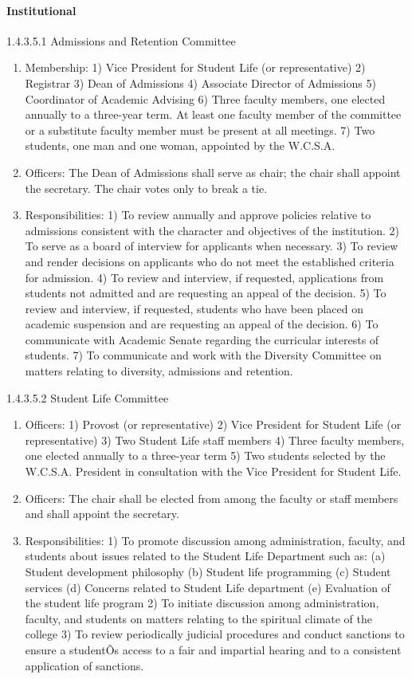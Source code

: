 \documentclass[letterpaper, 11pt]{article}
\begin{document}
			\paragraph{Institutional}
				1.4.3.5.1 Admissions and Retention Committee
				\begin{enumerate}[label=\alph*)]
					\item{Membership:}
					1) Vice President for Student Life (or representative)
					2) Registrar
					3) Dean of Admissions
					4) Associate Director of Admissions
					5) Coordinator of Academic Advising
					6) Three faculty members, one elected annually to a three-year term.  At least one faculty member of the committee or a substitute faculty member must be present at all meetings.
					7) Two students, one man and one woman, appointed by the W.C.S.A.
					\item{Officers:}
					The Dean of Admissions shall serve as chair; the chair shall appoint the secretary.  The chair votes only to break a tie.
					\item{Responsibilities:}
					1) To review annually and approve policies relative to admissions consistent with the character and objectives of the institution.
					2) To serve as a board of interview for applicants when necessary.
					3) To review and render decisions on applicants who do not meet the established criteria for admission.
					4) To review and interview, if requested, applications from students not admitted and are requesting an appeal of the decision.
					5) To review and interview, if requested, students who have been placed on academic suspension and are requesting an appeal of the decision.
					6) To communicate with Academic Senate regarding the curricular interests of students.
					7) To communicate and work with the Diversity Committee on matters relating to diversity, admissions and retention.
				\end{enumerate}
				1.4.3.5.2 Student Life Committee
				\begin{enumerate}[label=\alph*)]
					\item{Officers:}
					1) Provost (or representative)
					2) Vice President for Student Life (or representative)
					3) Two Student Life staff members
					4) Three faculty members, one elected annually to a three-year term
					5) Two students selected by the W.C.S.A. President in consultation with the Vice President for Student Life.
					\item{Officers:}
					The chair shall be elected from among the faculty or staff members and shall appoint the secretary.
					\item{Responsibilities:}
					1) To promote discussion among administration, faculty, and students about issues related to the Student Life Department such as:
					(a) Student development philosophy
					(b) Student life programming
					(c) Student services
					(d) Concerns related to Student Life department
					(e) Evaluation of the student life program
					2) To initiate discussion among administration, faculty, and students on matters relating to the spiritual climate of the college
					3) To review periodically judicial procedures and conduct sanctions to ensure a studentÕs access to a fair and impartial hearing and to a consistent application of sanctions.
				\end{enumerate}
\end{document}
